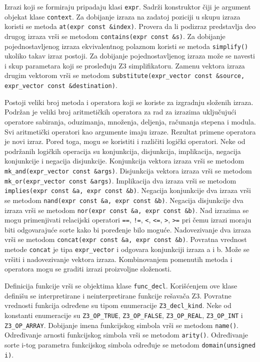 \documentclass[12pt,oneside]{memoir}
\begin{document}
Izrazi koji se formiraju pripadaju klasi \texttt{expr}. Sadrži konstruktor čiji je argument objekat klase \texttt{context}. Za dobijanje izraza na zadatoj poziciji u skupu izraza koristi se metoda \texttt{at(expr const \&index)}.  Provera da li podizraz predstavlja deo drugog izraza vrši se metodom  \texttt{contains(expr const \&s)}. Za dobijanje pojednostavljenog izraza ekvivalentnog polaznom koristi se metoda \texttt{simplify()} ukoliko takav izraz postoji. Za dobijanje pojednostavljenog izraza može se navesti i skup parametara koji se prosleđuju Z3 simplifikatoru. Zamenu vektora izraza drugim vektorom vrši se metodom \texttt{substitute(expr\_vector const \&source, expr\_vector const \&destination)}. 
\par
Postoji veliki broj metoda i operatora koji se koriste za izgradnju složenih izraza. Podržan je veliki broj aritmetičkih operatora za rad za izrazima uključujući operatore sabiranja, oduzimanja, množenja, deljenja, računanja stepena i modula. Svi aritmetički operatori kao argumente imaju izraze. Rezultat primene operatora je novi izraz. Pored toga, mogu se koristiti i različiti logički operatori. Neke od podržanih logičkih operacija su konjunkcija, disjunkcija, implikacija, negacija konjunkcije i negacija disjunkcije. Konjunkcija vektora izraza vrši se metodom \texttt{mk\_and(expr\_vector const \&args)}. Disjunkcija vektora izraza vrši se metodom \texttt{mk\_or(expr\_vector const \&args)}. Implikacija dva izraza vrši se metodom \texttt{implies(expr const \&a, expr const \&b)}. Negacija konjunkcije dva izraza vrši se metodom \texttt{nand(expr const  \&a, expr const \&b)}. Negacija disjunkcije dva izraza vrši se metodom \texttt{nor(expr const \&a, expr const \&b)}. Nad izrazima se mogu primenjivati relacijski operatori \texttt{==}, \texttt{!=}, \texttt{<}, \texttt{<=}, \texttt{>}, \texttt{>=} pri čemu izrazi moraju biti odgovarajuće sorte kako bi poređenje bilo moguće. Nadovezivanje dva izraza vrši se metodom \texttt{concat(expr const \&a, expr const \&b)}. 
Povratna vrednost metode \texttt{concat} je tipa \texttt{expr\_vector} i odgovara konjunkciji izraza a i b. Može se vršiti i nadovezivanje vektora izraza. Kombinovanjem pomenutih metoda i operatora mogu se graditi izrazi proizvoljne složenosti. 	
\par
Definicija funkcije vrši se objektima klase \texttt{func\_decl}. Korišćenjem ove klase definišu se interpretirane i neinterpretirane funkcije rešavača Z3. 
Povratne vrednosti funkcija određene su tipom enumeracije \texttt{Z3\_decl\_kind}. Neke od konstanti enumeracije su \texttt{Z3\_OP\_TRUE}, \texttt{Z3\_OP\_FALSE}, \texttt{Z3\_OP\_REAL}, \texttt{Z3\_OP\_INT} i \texttt{Z3\_OP\_ARRAY}. Dobijanje imena funkcijskog simbola vrši se metodom \texttt{name()}. Određivanje arnosti funkcijskog simbola vrši se metodom \texttt{arity()}. Određivanje sorte i-tog parametra funkcijskog simbola određuje se metodom \texttt{domain(unsigned i)}. 
\par
\end{document}
